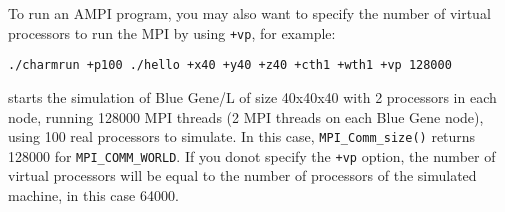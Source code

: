 To run an AMPI program, you may also want to specify the number of virtual 
processors to run the MPI by using {\tt +vp}, for example:
\begin{verbatim}
./charmrun +p100 ./hello +x40 +y40 +z40 +cth1 +wth1 +vp 128000
\end{verbatim}
starts the simulation of Blue Gene/L of size 40x40x40 with 2 processors 
in each node, running 128000 MPI threads (2 MPI threads on each Blue Gene node),
 using 100 real processors to simulate. In this case, {\tt MPI\_Comm\_size()}
returns 128000 for {\tt MPI\_COMM\_WORLD}. If you donot specify the {\tt +vp}
option, the number of virtual processors will be equal to the number of 
processors of the simulated machine, in this case 64000.


